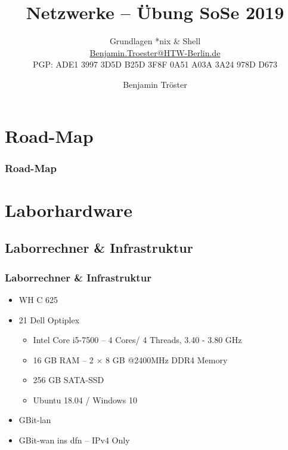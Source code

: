 \documentclass[xcolor=dvipsnames,aspectratio=169]{beamer}
\begin{document}

\title{Netzwerke -- Übung SoSe 2019}
\subtitle{Grundlagen *nix \& Shell\\
\href{mailto:Benjamin.Troester@HTW-Berlin.de}{Benjamin.Troester@HTW-Berlin.de}\\
		PGP: ADE1 3997 3D5D B25D 3F8F 0A51 A03A 3A24 978D D673 }

\author{Benjamin Tröster}

\date{}

\begin{frame}
\titlepage
\end{frame}

\section*{Road-Map}
\begin{frame}
\frametitle{Road-Map}
\begin{multicols}{2}
  \tableofcontents
\end{multicols}
\end{frame}

\section{Laborhardware}
\subsection{Laborrechner \& Infrastruktur}
\begin{frame}
	\frametitle{Laborrechner \& Infrastruktur}
\begin{itemize}
	\item WH C 625
	\item 21 Dell Optiplex
	\begin{itemize}
		\item Intel Core i5-7500 -- 4 Cores/ 4 Threads, 3.40 - 3.80 GHz
		\item 16 GB RAM -- 2 $\times$ 8 GB @2400MHz DDR4 Memory
		\item 256 GB SATA-SSD
		\item Ubuntu 18.04 / Windows 10
	\end{itemize}
	\item GBit-\ac{lan}
	\item GBit-\ac{wan} ins \ac{dfn} -- IPv4 Only
\end{itemize}
\end{frame}
\end{document}
